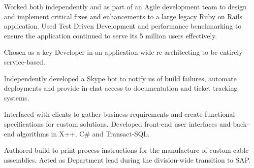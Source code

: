 
    Worked both independently and as part of an Agile development team to design
    and implement critical fixes and enhancements to a large legacy Ruby on
    Rails application. Used Test Driven Development and performance benchmarking
    to ensure the application continued to serve its 5 million users
    effectively.

    \begin{reslist}
      \item{Chosen as a key Developer in an application-wide re-architecting to
        be entirely service-based.}
      \item{Independently developed a Skype bot to notify us of build failures,
        automate deployments and provide in-chat access to documentation and
        ticket tracking systems.}
    \end{reslist}


    Interfaced with clients to gather business requirements and create
    functional specifications for custom solutions. Developed front-end user
    interfaces and back-end algorithms in X++, C\# and Transact-SQL.


    Authored build-to-print process instructions for the manufacture of custom
    cable assemblies. Acted as Department lead during the division-wide
    transition to SAP.



